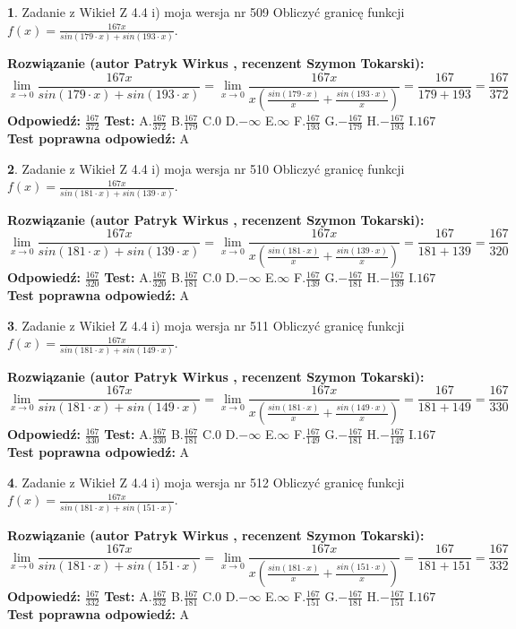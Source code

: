 \documentclass[12pt, a4paper]{article}
\theoremstyle{definition} %
\newtheorem{zad}{}
\newcommand{\zadStart}[1]{\begin{zad}#1\newline}
\newcommand{\zadStop}{\end{zad}}
\newcommand{\rozwStart}[2]{\noindent \textbf{Rozwiązanie (autor #1 , recenzent #2): }\newline}
\newcommand{\rozwStop}{\newline}
\newcommand{\odpStart}{\noindent \textbf{Odpowiedź:}\newline}
\newcommand{\odpStop}{\newline}
\newcommand{\testStart}{\noindent \textbf{Test:}\newline}
\newcommand{\testStop}{\newline}
\newcommand{\kluczStart}{\noindent \textbf{Test poprawna odpowiedź:}\newline}
\newcommand{\kluczStop}{\newline}
\begin{document}
\zadStart{Zadanie z Wikieł Z 4.4 i) moja wersja nr 509}
Obliczyć granicę funkcji $f(x)=\frac{167x}{sin(179\cdot x) +sin(193\cdot x)}$.
\zadStop
\rozwStart{Patryk Wirkus}{Szymon Tokarski}
$$\lim\limits_{x\to 0}\frac{167x}{sin(179\cdot x) +sin(193\cdot x)}=\lim\limits_{x\to 0}\frac{167x}{x(\frac{sin(179\cdot x)}{x}+\frac{sin(193\cdot x)}{x})}=\frac{167}{179+193} = \frac{167}{372}$$
\rozwStop
\odpStart
$\frac{167}{372}$
\odpStop
\testStart
A.$\frac{167}{372}$
B.$\frac{167}{179}$
C.$0$
D.$-\infty$
E.$\infty$
F.$\frac{167}{193}$
G.$-\frac{167}{179}$
H.$-\frac{167}{193}$
I.$167$
\testStop
\kluczStart
A
\kluczStop



\zadStart{Zadanie z Wikieł Z 4.4 i) moja wersja nr 510}
Obliczyć granicę funkcji $f(x)=\frac{167x}{sin(181\cdot x) +sin(139\cdot x)}$.
\zadStop
\rozwStart{Patryk Wirkus}{Szymon Tokarski}
$$\lim\limits_{x\to 0}\frac{167x}{sin(181\cdot x) +sin(139\cdot x)}=\lim\limits_{x\to 0}\frac{167x}{x(\frac{sin(181\cdot x)}{x}+\frac{sin(139\cdot x)}{x})}=\frac{167}{181+139} = \frac{167}{320}$$
\rozwStop
\odpStart
$\frac{167}{320}$
\odpStop
\testStart
A.$\frac{167}{320}$
B.$\frac{167}{181}$
C.$0$
D.$-\infty$
E.$\infty$
F.$\frac{167}{139}$
G.$-\frac{167}{181}$
H.$-\frac{167}{139}$
I.$167$
\testStop
\kluczStart
A
\kluczStop



\zadStart{Zadanie z Wikieł Z 4.4 i) moja wersja nr 511}
Obliczyć granicę funkcji $f(x)=\frac{167x}{sin(181\cdot x) +sin(149\cdot x)}$.
\zadStop
\rozwStart{Patryk Wirkus}{Szymon Tokarski}
$$\lim\limits_{x\to 0}\frac{167x}{sin(181\cdot x) +sin(149\cdot x)}=\lim\limits_{x\to 0}\frac{167x}{x(\frac{sin(181\cdot x)}{x}+\frac{sin(149\cdot x)}{x})}=\frac{167}{181+149} = \frac{167}{330}$$
\rozwStop
\odpStart
$\frac{167}{330}$
\odpStop
\testStart
A.$\frac{167}{330}$
B.$\frac{167}{181}$
C.$0$
D.$-\infty$
E.$\infty$
F.$\frac{167}{149}$
G.$-\frac{167}{181}$
H.$-\frac{167}{149}$
I.$167$
\testStop
\kluczStart
A
\kluczStop



\zadStart{Zadanie z Wikieł Z 4.4 i) moja wersja nr 512}
Obliczyć granicę funkcji $f(x)=\frac{167x}{sin(181\cdot x) +sin(151\cdot x)}$.
\zadStop
\rozwStart{Patryk Wirkus}{Szymon Tokarski}
$$\lim\limits_{x\to 0}\frac{167x}{sin(181\cdot x) +sin(151\cdot x)}=\lim\limits_{x\to 0}\frac{167x}{x(\frac{sin(181\cdot x)}{x}+\frac{sin(151\cdot x)}{x})}=\frac{167}{181+151} = \frac{167}{332}$$
\rozwStop
\odpStart
$\frac{167}{332}$
\odpStop
\testStart
A.$\frac{167}{332}$
B.$\frac{167}{181}$
C.$0$
D.$-\infty$
E.$\infty$
F.$\frac{167}{151}$
G.$-\frac{167}{181}$
H.$-\frac{167}{151}$
I.$167$
\testStop
\kluczStart
A
\kluczStop
\end{document}

